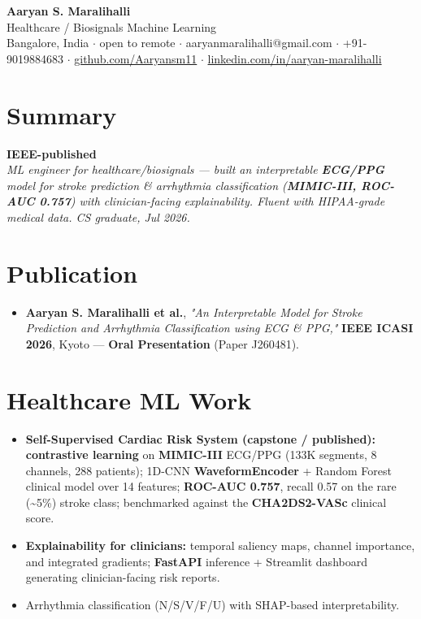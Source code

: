 \documentclass[10pt,a4paper]{article}
\begin{document}
\vspace*{-1cm}
\begin{center}
{\LARGE\bfseries Aaryan S. Maralihalli}\\[0.5em]
{\large Healthcare / Biosignals Machine Learning}\\[0.3em]
Bangalore, India $\cdot$ open to remote $\cdot$ aaryanmaralihalli@gmail.com $\cdot$ +91-9019884683 $\cdot$ \href{https://github.com/Aaryansm11}{github.com/Aaryansm11} $\cdot$ \href{https://linkedin.com/in/aaryan-maralihalli}{linkedin.com/in/aaryan-maralihalli}
\end{center}\vspace{0.4ex}
\section*{Summary}
\vspace{1pt}\textbf{IEEE-published}\\
\textit{ML engineer for healthcare/biosignals --- built an interpretable \textbf{ECG/PPG} model for stroke prediction \& arrhythmia classification (\textbf{MIMIC-III, ROC-AUC 0.757}) with clinician-facing explainability. Fluent with HIPAA-grade medical data. CS graduate, Jul 2026.}\hfill \par\vspace{1pt}
\section*{Publication}
\begin{itemize}
\item \textbf{Aaryan S. Maralihalli et al.}, \textit{"An Interpretable Model for Stroke Prediction and Arrhythmia Classification using ECG \& PPG,"} \textbf{IEEE ICASI 2026}, Kyoto --- \textbf{Oral Presentation} (Paper J260481).
\end{itemize}
\section*{Healthcare ML Work}
\begin{itemize}
\item \textbf{Self-Supervised Cardiac Risk System (capstone / published):} \textbf{contrastive learning} on \textbf{MIMIC-III} ECG/PPG (133K segments, 8 channels, 288 patients); 1D-CNN \textbf{WaveformEncoder} + Random Forest clinical model over 14 features; \textbf{ROC-AUC 0.757}, recall 0.57 on the rare (\textasciitilde{}5\%) stroke class; benchmarked against the \textbf{CHA2DS2-VASc} clinical score.
\item \textbf{Explainability for clinicians:} temporal saliency maps, channel importance, and integrated gradients; \textbf{FastAPI} inference + Streamlit dashboard generating clinician-facing risk reports.
\item Arrhythmia classification (N/S/V/F/U) with SHAP-based interpretability.
\end{itemize}
\end{document}
